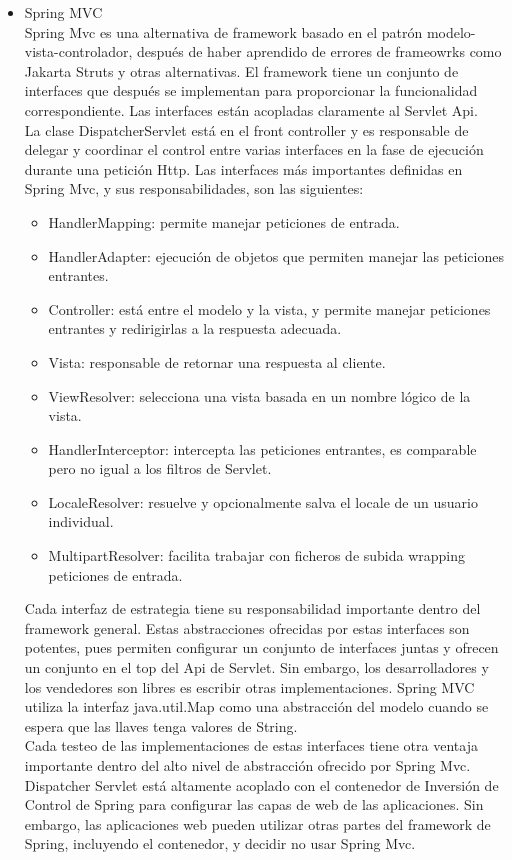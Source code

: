 \begin{itemize}
		\item Spring MVC \\ 
		Spring Mvc es una alternativa de framework basado en el patrón modelo-vista-controlador, después de haber aprendido de errores de frameowrks como Jakarta Struts y otras alternativas.
		El framework tiene un conjunto de interfaces que después se implementan para proporcionar la funcionalidad correspondiente. Las interfaces están acopladas claramente al Servlet Api.\cite{spring}\\
		La clase DispatcherServlet está en el front controller y es responsable de delegar y coordinar el control entre varias interfaces en la fase de ejecución durante una petición Http.
		Las interfaces más importantes definidas en Spring Mvc, y sus responsabilidades, son las siguientes:
		\begin{itemize}
			\item HandlerMapping: permite manejar peticiones de entrada.
			\item HandlerAdapter: ejecución de objetos que permiten manejar las peticiones entrantes.
			\item Controller: está entre el modelo y la vista, y permite manejar peticiones entrantes y redirigirlas a la respuesta adecuada. 
			\item Vista: responsable de retornar una respuesta al cliente. 
			\item ViewResolver: selecciona una vista basada en un nombre lógico de la vista.
			\item HandlerInterceptor: intercepta las peticiones entrantes, es comparable pero no igual a los filtros de Servlet.
			\item LocaleResolver: resuelve y opcionalmente salva el locale de un usuario individual.
			\item MultipartResolver: facilita trabajar con ficheros de subida wrapping peticiones de entrada.
		\end{itemize}
		Cada interfaz de estrategia tiene su responsabilidad importante dentro del framework general. Estas abstracciones ofrecidas por estas interfaces son potentes, pues permiten configurar un conjunto de interfaces juntas y ofrecen un conjunto en el top del Api de Servlet. Sin embargo, los desarrolladores y los vendedores son libres es escribir otras implementaciones. Spring MVC utiliza la interfaz java.util.Map como una abstracción del modelo cuando se espera que las llaves tenga valores de String. \\
		Cada testeo de las implementaciones de estas interfaces tiene otra ventaja importante dentro del alto nivel de abstracción ofrecido por Spring Mvc. Dispatcher Servlet está altamente acoplado con el contenedor de Inversión de Control de Spring para configurar las capas de web de las aplicaciones. Sin embargo, las aplicaciones web pueden utilizar otras partes del framework de Spring, incluyendo el contenedor, y decidir no usar Spring Mvc. \cite{MVC}\\

\end{itemize}
